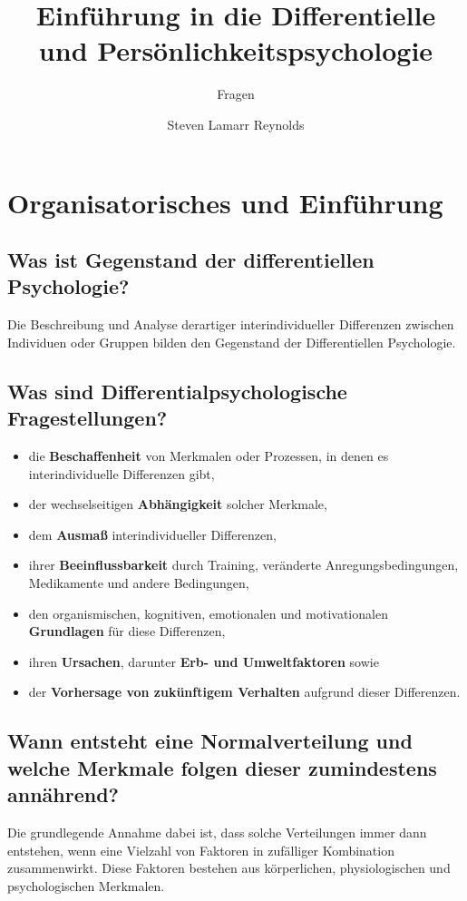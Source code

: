 \documentclass[a6paper,9pt,DIV=14]{scrartcl}
\begin{document}
\title{Einführung in die Differentielle und Persönlichkeitspsychologie}
\subtitle{Fragen}
\author{Steven Lamarr Reynolds}
\maketitle

\clearpage
\tableofcontents
\clearpage

\section{Organisatorisches und Einführung}

\subsection{Was ist Gegenstand der differentiellen Psychologie?}%
    Die Beschreibung und Analyse derartiger interindividueller Differenzen zwischen Individuen oder Gruppen bilden den Gegenstand der Differentiellen Psychologie.
\subsection{Was sind Differentialpsychologische Fragestellungen?}
    \begin{itemize}\itemsep-0.5ex
        \item die \textbf{Beschaffenheit} von Merkmalen oder Prozessen, in denen es interindividuelle Differenzen gibt,
        \item der wechselseitigen \textbf{Abhängigkeit} solcher Merkmale,
        \item dem \textbf{Ausmaß} interindividueller Differenzen,
        \item ihrer \textbf{Beeinflussbarkeit} durch Training, veränderte Anregungsbedingungen, Medikamente und andere Bedingungen,
        \item den organismischen, kognitiven, emotionalen und motivationalen \textbf{Grundlagen} für diese Differenzen,
        \item ihren \textbf{Ursachen}, darunter \textbf{Erb- und Umweltfaktoren} sowie
        \item der \textbf{Vorhersage von zukünftigem Verhalten} aufgrund dieser Differenzen.
    \end{itemize}
\subsection{Wann entsteht eine Normalverteilung und welche Merkmale folgen dieser zumindestens annährend?} %
    Die grundlegende Annahme dabei ist, dass solche Verteilungen immer dann entstehen, wenn eine Vielzahl von Faktoren in zufälliger Kombination zusammenwirkt. Diese Faktoren bestehen aus körperlichen, physiologischen und psychologischen Merkmalen.
\end{document}
